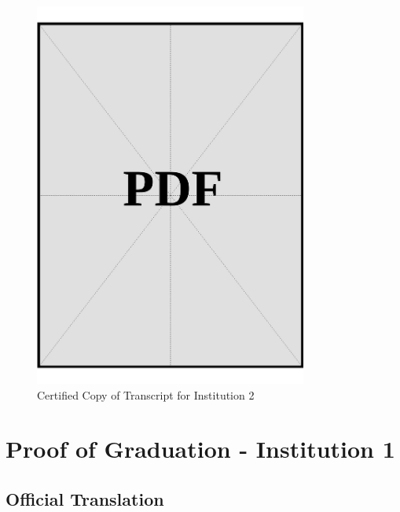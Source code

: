 \begin{figure}[h]
    \centering
    \includegraphics[page=1, width=0.8\textwidth]{../docs/applicant/post-secondary-institutions/institution-2/transcript/certified-copies.pdf}
    \caption{Certified Copy of Transcript for Institution 2}
    \label{fig:institution-2-transcript-certified-copy}
\end{figure}

\vspace*{\fill}
\clearpage


\section{Proof of Graduation - Institution 1}\label{sec:institution-1-proof-of-graduation}

\subsection*{Official Translation}
\vspace*{\fill}

